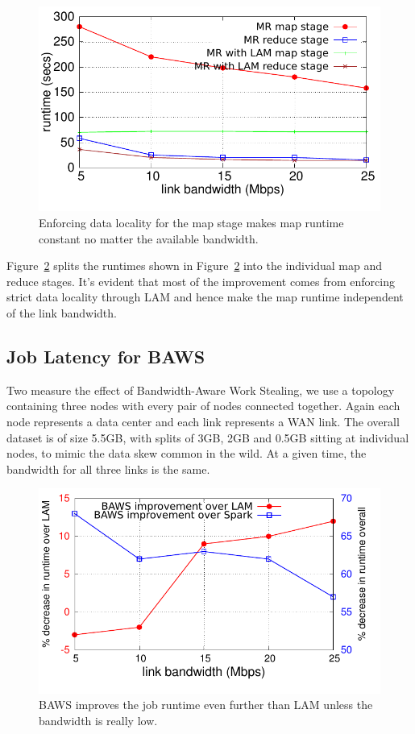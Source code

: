 \begin{figure}[!ht]
\centering\includegraphics[width=\columnwidth]{figs/stage-time-localMap.pdf}
\vspace{-1.2em}
\caption{Enforcing data locality for the map stage makes map runtime constant no matter the available bandwidth.}
\label{fig:stage-time-localMap}
\vspace{.7em}
\end{figure}

Figure~\ref{fig:stage-time-localMap} splits the runtimes shown in Figure~\ref{fig:stage-time-localMap} into the individual map and reduce stages. It's evident that most of the improvement comes from enforcing strict data locality through LAM and hence make the map runtime independent of the link bandwidth. 

\subsection{Job Latency for BAWS}

Two measure the effect of Bandwidth-Aware Work Stealing, we use a topology containing three nodes with every pair of nodes connected together. 
Again each node represents a data center and each link represents a WAN link. The overall dataset is of size 5.5GB, with splits of 3GB, 2GB and 0.5GB
sitting at individual nodes, to mimic the data skew common in the wild. At a given time, the bandwidth for all three links is the same.     

\begin{figure}[!ht]
\centering\includegraphics[width=\columnwidth]{figs/baws.pdf}
\vspace{-1.2em}
\caption{BAWS improves the job runtime even further than LAM unless the bandwidth is really low.}
\label{fig:stage-time-localMap}
\vspace{.7em}
\end{figure}